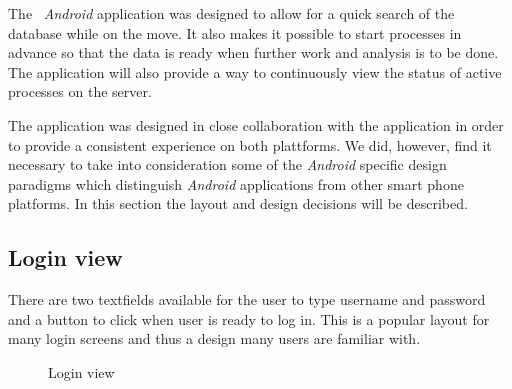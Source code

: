 


The \appName\ \textit{Android} application was designed to allow for a quick search of the database while on the move. It also makes it possible to start processes in advance so that the data is ready when further work and analysis is to be done. The application will also provide a way to continuously view the status of active processes on the server. 

The application was designed in close collaboration with the  application in order to provide a consistent experience on both plattforms.  We did, however, find it necessary to take into consideration some of the \textit{Android} specific design paradigms which distinguish \textit{Android} applications from other smart phone platforms. In this section the layout and design decisions will be described.


\subsection{Login view}
There are two textfields available for the user to type username and password and a button to click when user is ready to log in.
This is a popular layout for many login screens and thus a design many users are familiar with.


\begin{figure}[ht]
\caption{\footnotesize Login view}
\label{fig:and_login}
\end{figure}
\FloatBarrier

